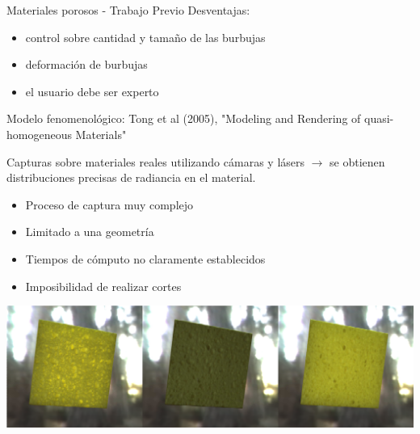 \documentclass[spanish]{beamer}
\begin{document}
\begin{frame}{Materiales porosos - Trabajo Previo}
Desventajas: 
\begin{block}{}
\begin{itemize}
\item control sobre cantidad y tamaño de las burbujas
\item deformación de burbujas
\item el usuario debe ser experto
\end{itemize}
\end{block}


\end{frame}

\begin{frame}

Modelo fenomenológico: Tong et al (2005), "Modeling and Rendering of quasi-homogeneous Materials"

Capturas sobre materiales reales utilizando cámaras y lásers $\rightarrow$ se obtienen distribuciones precisas de radiancia en el material.

\begin{itemize}
\item Proceso de captura muy complejo
\item Limitado a una geometría
\item Tiempos de cómputo no claramente establecidos
\item Imposibilidad de realizar cortes
\end{itemize}

\includegraphics[scale = 0.3]{../figures/esponja}

\end{frame}
\end{document}
